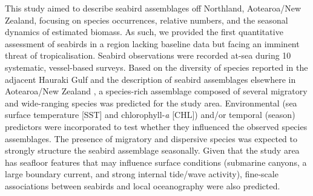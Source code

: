 \documentclass[preprint, 3p, authoryear]{elsarticle} %
\begin{document}
This study aimed to describe seabird assemblages off Northland, Aotearoa/New Zealand, focusing on species occurrences, relative numbers, and the seasonal dynamics of estimated biomass. As such, we provided the first quantitative assessment of seabirds in a region lacking baseline data but facing an imminent threat of tropicalisation. Seabird observations were recorded at-sea during 10 systematic, vessel-based surveys. Based on the diversity of species reported in the adjacent Hauraki Gulf \citep{gaskin2017, stateof2021} and the description of seabird assemblages elsewhere in Aotearoa/New Zealand \citep{vooren1972, brough2025, daudt2025}, a species-rich assemblage composed of several migratory and wide-ranging species was predicted for the study area. Environmental (sea surface temperature [SST] and chlorophyll-\emph{a} [CHL]) and/or temporal (season) predictors were incorporated to test whether they influenced the observed species assemblages. The presence of migratory and dispersive species was expected to strongly structure the seabird assemblage seasonally. Given that the study area has seafloor features that may influence surface conditions (submarine canyons, a large boundary current, and strong internal tide/wave activity), fine-scale associations between seabirds and local oceanography were also predicted.

\end{document}
